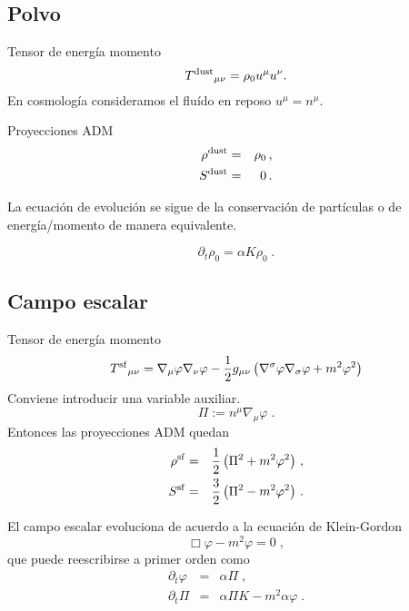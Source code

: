\documentclass[12pt,fleqn,b5paper]{article}
\begin{document}
\subsection{Polvo}

Tensor de energía momento
\begin{equation}
  {T^{\rm dust}}_{\mu\nu} =  \rho_0 u^\mu u^\nu .
\end{equation}
En cosmología consideramos el fluído en reposo $u^\mu=n^\mu$.

Proyecciones ADM
\begin{eqnarray}
  \label{eq:dustTmunu}
  \rho^{\rm dust} &=&  \rho_0 \,,\\
  S^{\rm dust} &=&  0\,.
\end{eqnarray}

La ecuación de evolución se sigue de la conservación de partículas o
de energía/momento de manera equivalente.

\begin{equation}
  \partial_t \rho_0 = \alpha K \rho_0\;. 
\end{equation}

\subsection{Campo escalar}

Tensor de energía momento
\begin{equation}
  {T^{\rm sf}}_{\mu\nu} =  \nabla_\mu \varphi \nabla_\nu \varphi 
  -\frac{1}{2} g_{\mu\nu}\left(\nabla^\sigma \varphi \nabla_\sigma \varphi + m^2\varphi^2\right)
\end{equation}
Conviene introducir una variable auxiliar.
\begin{equation}
  \Pi:= n^\mu \nabla_\mu\varphi\;.
\end{equation}
Entonces las proyecciones ADM quedan
\begin{eqnarray}
  \label{eq:dustTmunu}
  \rho^{\rm sf} &=&  \frac{1}{2}\left(\Pi^2 + m^2\varphi^2\right) \,,\\
  S^{\rm sf} &=&  \frac{3}{2}\left(\Pi^2 - m^2\varphi^2\right)\,.
\end{eqnarray}

El campo escalar evoluciona de acuerdo a la ecuación de Klein-Gordon
\begin{equation}
  \Box \varphi - m^2\varphi = 0\;,
\end{equation}
que puede reescribirse a primer orden como
\begin{eqnarray}
  \partial_t \varphi &=& \alpha \Pi \;, \\
  \partial_t \Pi & =& \alpha \Pi K -m^2\alpha \varphi\;.
\end{eqnarray}
\end{document}
